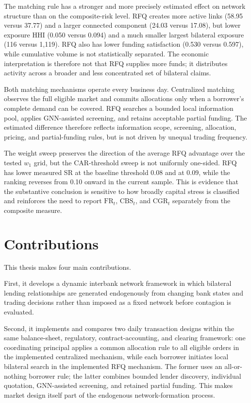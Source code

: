The matching rule has a stronger and more precisely estimated effect on
network structure than on the composite-risk level. RFQ creates more
active links (58.95 versus 37.77) and a larger connected component (24.03
versus 17.08), but lower exposure HHI (0.050 versus 0.094) and a much
smaller largest bilateral exposure (116 versus 1,119). RFQ also has lower
funding satisfaction (0.530 versus 0.597), while cumulative volume is not
statistically separated. The economic interpretation is therefore not
that RFQ supplies more funds; it distributes activity across a broader
and less concentrated set of bilateral claims.

Both matching mechanisms operate every business day. Centralized
matching observes the full eligible market and commits allocations only
when a borrower's complete demand can be covered. RFQ searches a bounded
local information pool, applies GNN-assisted screening, and retains
acceptable partial funding. The estimated difference therefore reflects
information scope, screening, allocation, pricing, and partial-funding
rules, but is not driven by unequal trading frequency.

The weight sweep preserves the direction of the average RFQ advantage
over the tested \(w_1\) grid, but the CAR-threshold sweep is not uniformly
one-sided. RFQ has lower measured SR at the baseline threshold 0.08 and
at 0.09, while the ranking reverses from 0.10 onward in
the current sample. This is evidence that the substantive conclusion is
sensitive to how broadly capital stress is classified and reinforces the
need to report \(\mathrm{FR}_t\), \(\mathrm{CBS}_t\), and
\(\mathrm{CGR}_t\) separately from the composite measure.

\section{Contributions}

This thesis makes four main contributions.

First, it develops a dynamic interbank network framework in which
bilateral lending relationships are generated endogenously from changing
bank states and trading decisions rather than imposed as a fixed network
before contagion is evaluated.

Second, it implements and compares two daily transaction designs within
the same balance-sheet, regulatory, contract-accounting, and clearing
framework: one coordinating principal applies a common allocation rule to
all eligible orders in the implemented centralized mechanism, while each
borrower initiates local bilateral search in the implemented RFQ mechanism.
The former uses an all-or-nothing borrower rule; the latter combines bounded
lender discovery, individual quotation, GNN-assisted screening, and retained
partial funding. This makes market design itself part of the endogenous
network-formation process.

